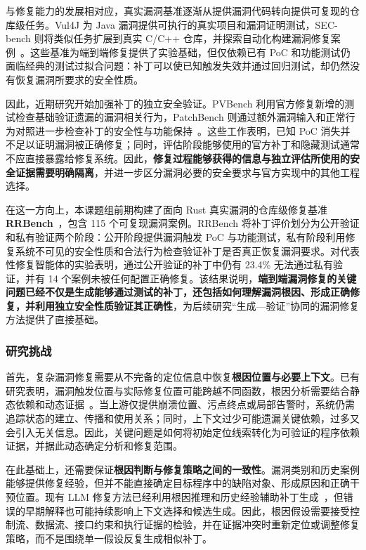 与修复能力的发展相对应，真实漏洞基准逐渐从提供漏洞代码转向提供可复现的仓库级任务。Vul4J 为 Java 漏洞提供可执行的真实项目和漏洞证明测试，SEC-bench 则将类似任务扩展到真实 C/C++ 仓库，并探索自动化构建漏洞修复案例~\cite{bui2022vul4j,secbench}。这些基准为端到端修复提供了实验基础，但仅依赖已有 PoC 和功能测试仍面临经典的测试过拟合问题：补丁可以使已知触发失效并通过回归测试，却仍然没有恢复漏洞所要求的安全性质。

因此，近期研究开始加强补丁的独立安全验证。PVBench 利用官方修复新增的测试检查基础验证遗漏的漏洞相关行为，PatchBench 则通过额外漏洞输入和正常行为对照进一步检查补丁的安全性与功能保持~\cite{yu2026pvbench,shen2026patchbench}。这些工作表明，已知 PoC 消失并不足以证明漏洞被正确修复；同时，评估阶段能够使用的官方补丁和隐藏测试通常不应直接暴露给修复系统。因此，\textbf{修复过程能够获得的信息与独立评估所使用的安全证据需要明确隔离}，并进一步区分漏洞必要的安全要求与官方实现中的其他工程选择。

在这一方向上，本课题组前期构建了面向 Rust 真实漏洞的仓库级修复基准 \textbf{RRBench}~\cite{rrbench}，包含 115 个可复现漏洞案例。RRBench 将补丁评价划分为公开验证和私有验证两个阶段：公开阶段提供漏洞触发 PoC 与功能测试，私有阶段利用修复系统不可见的安全性质和合法行为检查验证补丁是否真正恢复漏洞要求。对代表性修复智能体的实验表明，通过公开验证的补丁中仍有 23.4\% 无法通过私有验证，并有 14 个案例未被任何配置正确修复。该结果说明，\textbf{端到端漏洞修复的关键问题已经不仅是生成能够通过测试的补丁，还包括如何理解漏洞根因、形成正确修复，并利用独立安全性质验证其正确性}，为后续研究“生成—验证”协同的漏洞修复方法提供了直接基础。

\subsubsection{研究挑战}

首先，复杂漏洞修复需要从不完备的定位信息中恢复\textbf{根因位置与必要上下文}。已有研究表明，漏洞触发位置与实际修复位置可能跨越不同函数，根因分析需要结合静态依赖和动态证据~\cite{li2024interpvd,nong2025appatch}。当上游仅提供崩溃位置、污点终点或局部告警时，系统仍需追踪状态的建立、传播和使用关系；同时，上下文过少可能遗漏关键依赖，过多又会引入无关信息。因此，关键问题是如何将初始定位线索转化为可验证的程序依赖证据，并据此动态确定分析和修复范围。

在此基础上，还需要保证\textbf{根因判断与修复策略之间的一致性}。漏洞类别和历史案例能够提供修复经验，但并不能直接确定目标程序中的缺陷对象、形成原因和正确干预位置。现有 LLM 修复方法已经利用根因推理和历史经验辅助补丁生成~\cite{nong2025appatch,wang2026kumushi}，但错误的早期解释也可能持续影响上下文选择和候选生成。因此，根因假设需要接受控制流、数据流、接口约束和执行证据的检验，并在证据冲突时重新定位或调整修复策略，而不是围绕单一假设反复生成相似补丁。

